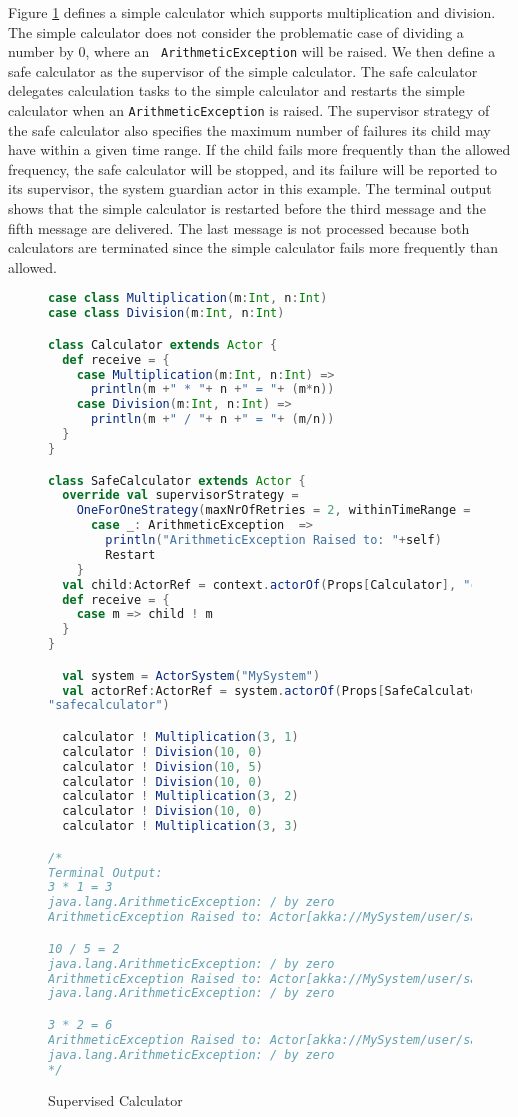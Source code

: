 Figure \ref{supervisedcalculator} defines a simple calculator which supports
multiplication and division. The simple calculator does not consider the
problematic case of dividing a number by 0, where an {\tt
ArithmeticException} will be raised.  We then define a safe calculator as the 
supervisor of the simple calculator.  The safe calculator delegates 
calculation tasks to the simple calculator and restarts the simple calculator 
when an {\tt ArithmeticException} is raised.  The supervisor strategy of
the safe calculator also specifies the maximum number of failures its child may 
have within a given time range.  If the child fails more frequently than the 
allowed frequency, the safe calculator will be  stopped, and its failure will be
reported to its supervisor, the system guardian actor in this example.  The
terminal output shows that the simple calculator is restarted before the third 
message and the fifth message are delivered.  The last message is not processed
because both calculators are terminated since the simple calculator fails more 
frequently than allowed.

\begin{figure}
\label{supervisedcalculator}

  \begin{lstlisting}[language=scala]
case class Multiplication(m:Int, n:Int)
case class Division(m:Int, n:Int)

class Calculator extends Actor {
  def receive = {
    case Multiplication(m:Int, n:Int) =>
      println(m +" * "+ n +" = "+ (m*n))
    case Division(m:Int, n:Int) =>
      println(m +" / "+ n +" = "+ (m/n))
  }
}

class SafeCalculator extends Actor {
  override val supervisorStrategy =
    OneForOneStrategy(maxNrOfRetries = 2, withinTimeRange = 1 minute) {
      case _: ArithmeticException  =>
        println("ArithmeticException Raised to: "+self)
        Restart
    }
  val child:ActorRef = context.actorOf(Props[Calculator], "child")
  def receive = {
    case m => child ! m
  }
}

  val system = ActorSystem("MySystem")
  val actorRef:ActorRef = system.actorOf(Props[SafeCalculator],
"safecalculator")

  calculator ! Multiplication(3, 1)
  calculator ! Division(10, 0)
  calculator ! Division(10, 5)
  calculator ! Division(10, 0)
  calculator ! Multiplication(3, 2)
  calculator ! Division(10, 0)
  calculator ! Multiplication(3, 3)

/*
Terminal Output:
3 * 1 = 3
java.lang.ArithmeticException: / by zero
ArithmeticException Raised to: Actor[akka://MySystem/user/safecalculator]

10 / 5 = 2
java.lang.ArithmeticException: / by zero
ArithmeticException Raised to: Actor[akka://MySystem/user/safecalculator]
java.lang.ArithmeticException: / by zero

3 * 2 = 6
ArithmeticException Raised to: Actor[akka://MySystem/user/safecalculator]
java.lang.ArithmeticException: / by zero
*/
    \end{lstlisting}
  \caption{Supervised Calculator}
\end{figure}